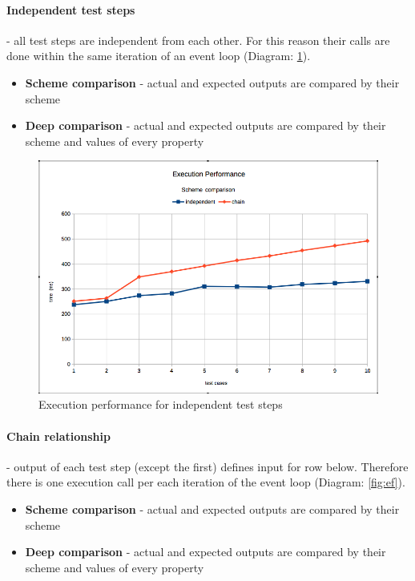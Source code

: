 \paragraph{Independent test steps} - all test steps are independent from each other. For this reason their calls are done within the same iteration of an event loop (Diagram: \ref{fig:ei}).
\begin{itemize}
	\item \textbf{Scheme comparison} - actual and expected outputs are compared by their scheme
	\item \textbf{Deep comparison} - actual and expected outputs are compared by their scheme and values of every property
\end{itemize}
\begin{figure}[ht]
	\label{fig:ei}
	\centering
	\includegraphics[width=\textwidth]{grafiken/exec_scheme}
	\caption{Execution performance for independent test steps}
\end{figure}

\paragraph{Chain relationship} - output of each test step (except the first) defines input for row below. Therefore there is one execution call per each iteration of the event loop (Diagram: \ref{fig:ef}).
\begin{itemize}
	\item \textbf{Scheme comparison} - actual and expected outputs are compared by their scheme
	\item \textbf{Deep comparison} - actual and expected outputs are compared by their scheme and values of every property
\end{itemize}

